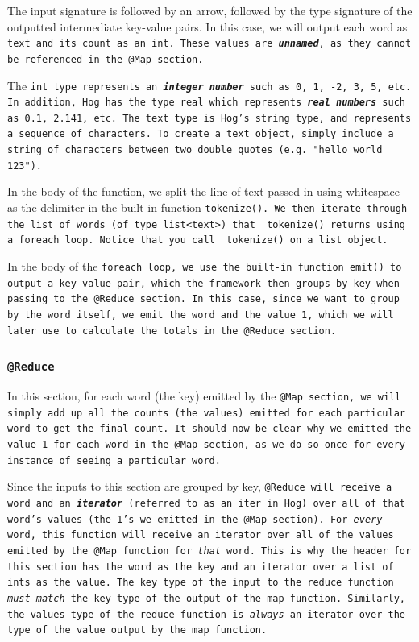 \documentclass{report}
\begin{document}
The input signature is followed by an arrow, followed by the type signature of the
outputted intermediate key-value pairs. In this case, we will output each word as
\tt text \rm and its count as an \tt int\rm. These values are
\textbf{\emph{unnamed}}, as they cannot be referenced in the \tt @Map \rm section.

The \tt int \rm type represents an \textbf{\emph{integer number}} such as 0, 1, -2,
3, 5, etc. In addition, Hog has the type \tt real \rm which represents
\textbf{\emph{real numbers}} such as 0.1, 2.141, etc. The \tt text \rm type is
Hog's string type, and represents a sequence of characters. To create a \tt text
\rm object, simply include a string of characters between two double quotes (e.g.
\tt "hello world 123"\rm).

In the body of the function, we split the line of text passed in using whitespace as the delimiter 
in the built-in function  \tt tokenize()\rm. We
then iterate through the \tt list \rm of words (of type \tt list<text>\rm) that \tt
tokenize() \rm returns using a \tt foreach \rm loop. Notice that you call \tt
tokenize() \rm on a \tt list \rm object.

In the body of the \tt foreach \rm loop, we use the built-in function \tt emit()
\rm to output a key-value pair, which the framework then groups by key when passing
to the \tt @Reduce \rm section. In this case, since we want to group by the word
itself, we emit the word and the value \tt 1\rm, which we will later use to
calculate the totals in the \tt @Reduce \rm section.

\subsubsection{\tt @Reduce \rm}


In this section, for each word (the key) emitted by the \tt @Map \rm section, we
will simply add up all the counts (the values) emitted for each particular word to
get the final count. It should now be clear why we emitted the value \tt 1 \rm for
each word in the \tt @Map \rm section, as we do so once for every instance of
seeing a particular word.

Since the inputs to this section are grouped by key, \tt @Reduce \rm will receive a
word and an \textbf{\emph{iterator}} (referred to as an \tt iter \rm in Hog) over
all of that word's values (the \tt 1\rm's we emitted in the \tt @Map \rm section).
For \emph{every} word, this function will receive an iterator over all of the
values emitted by the \tt @Map \rm function for \emph{that} word. This is why the
header for this section has the word as the key and an iterator over a \tt list \rm
of \tt int\rm s as the value. The key type of the input to the reduce function
\emph{must match} the key type of the output of the map function. Similarly, the
values type of the reduce function is \emph{always} an iterator over the type of
the value output by the map function.
\end{document}
